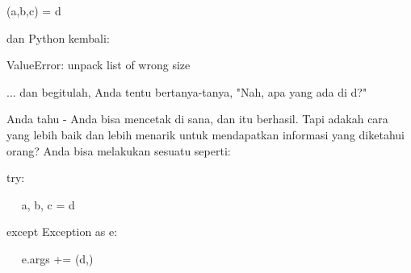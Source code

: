{\fontsize{10pt}{10pt}\selectfont  (a,b,c) = d} \par
\noindent 
\vspace{12pt}
\noindent 
dan Python kembali: \par
\noindent 
\vspace{12pt}
\noindent 
 
{\fontsize{10pt}{10pt}\selectfont  ValueError: unpack list of wrong size} \par
\vspace{16pt}
\noindent 
... dan begitulah, Anda tentu bertanya-tanya, "Nah, apa yang ada di d?" \par
\noindent 
\vspace{12pt}
\noindent 
Anda tahu - Anda bisa mencetak di sana, dan itu berhasil. Tapi adakah cara yang lebih baik dan lebih menarik untuk mendapatkan informasi yang diketahui orang? Anda bisa melakukan sesuatu seperti: \par
\vspace{20pt}
\noindent 
 
 try: \par
\noindent 
 
~~ a, b, c = d \par
\noindent 
 
 except Exception as e: \par
\noindent 
 
~~ e.args += (d,) \par
\noindent 
 
